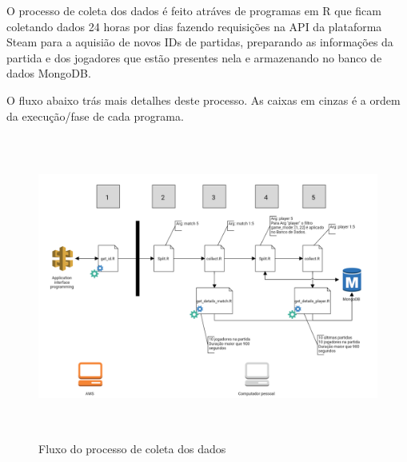 \documentclass[
12pt,				%
openright,			%
oneside,			%
a4paper,			%
english,			%
brazil,				%
]{abntex2}
\begin{document}
O processo de coleta dos dados é feito atráves de programas em R que ficam
coletando dados 24 horas por dias fazendo requisições na API da plataforma
Steam para a aquisião de novos IDs de partidas, preparando as informações da
partida e dos jogadores que estão presentes nela e armazenando no banco de dados
MongoDB.


O fluxo abaixo trás mais detalhes deste processo. As caixas em cinzas é a ordem
da execução/fase de cada programa.

\begin{figure}[H]
  \begin{center}
    \includegraphics[width=14cm,height=10cm]{image/collect.png}
    \caption{Fluxo do processo de coleta dos dados}
  \end{center}
\end{figure}
\end{document}
